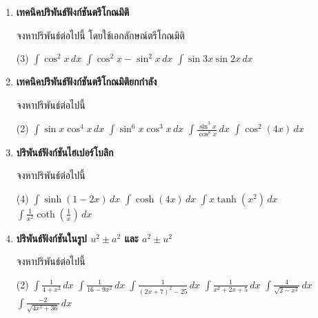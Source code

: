 \begin{enumerate}


\item \textbf{เทคนิคปริพันธ์ฟังก์ชันตรีโกณมิติ}

จงหาปริพันธ์ต่อไปนี้ โดยใช้เอกลักษณ์ตรีโกณมิติ

\begin{tasks}[after-skip=150pt, after-item-skip=150pt](3)
\task $\int \cos^2 x \, dx$
\task $\int \cos^2 x - \sin^2 x \,dx$
\task $\int \sin 3x \sin 2x \, dx$
\end{tasks}

\item \textbf{เทคนิคปริพันธ์ฟังก์ชันตรีโกณมิติยกกำลัง}

จงหาปริพันธ์ต่อไปนี้ 
\begin{tasks}[after-skip=100pt, after-item-skip=100pt](2)
\task $\int \sin x \cos^4 x \, dx$ 
\task $\int \sin^{6} x \cos ^3 x \, dx$
\task $\int \frac{\sin^3 x}{\cos^8 x} \, dx$
\task $\int \cos^2 (4x) \, dx$
\end{tasks}

\newpage
\item \textbf{ปริพันธ์ฟังก์ชันไฮเปอร์โบลิก}

จงหาปริพันธ์ต่อไปนี้

\begin{tasks}[after-skip=80pt, after-item-skip=80pt](4)
\task $\int \sinh(1-2x) \, dx$
\task $\int \cosh(4x) \,dx$
\task $\int x\tanh(x^2) \, dx$
\task $\int \frac{1}{x^2} \coth\left(\frac{1}{x}\right) \, dx$
\end{tasks}


\item \textbf{ปริพันธ์ฟังก์ชันในรูป $u^2 \pm a^2$ และ $a^2 \pm u^2$}

จงหาปริพันธ์ต่อไปนี้
\begin{tasks}[after-skip=120pt, after-item-skip=120pt](2)
\task $\int \frac{1}{4 + x^2} \, dx$
\task $\int \frac{1}{16 - 9x^2} \, dx$
\task $\int \frac{1}{(2x+7)^2 - 25} \, dx$
\task $\int \frac{1}{x^2 + 2x + 5} \, dx$
\task $\int \frac{4}{\sqrt{2 - x^2}} \, dx$
\task $\int \frac{-2}{\sqrt{4x^2 + 36}} \, dx$
\end{tasks}

\end{enumerate}